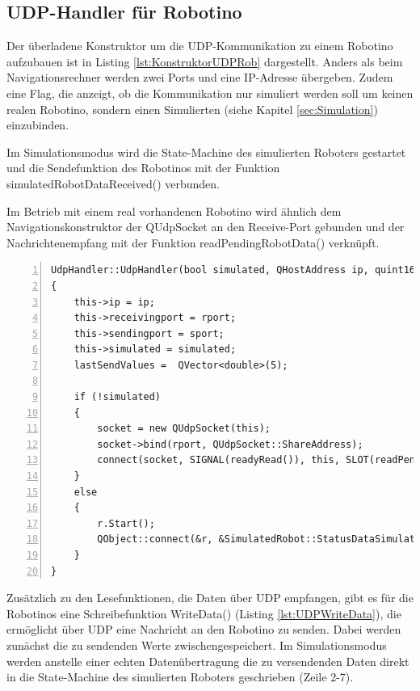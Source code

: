 \subsection{UDP-Handler für Robotino}

Der überladene Konstruktor um die UDP-Kommunikation zu einem Robotino aufzubauen ist in Listing \ref{lst:KonstruktorUDPRob} dargestellt. Anders als beim Navigationsrechner werden zwei Ports und eine IP-Adresse übergeben. Zudem eine Flag, die anzeigt, ob die Kommunikation nur simuliert werden soll um keinen realen Robotino, sondern einen Simulierten (siehe Kapitel \ref{sec:Simulation}) einzubinden. 

Im Simulationsmodus wird die State-Machine des simulierten Roboters gestartet und die Sendefunktion des Robotinos mit der Funktion simulatedRobotDataReceived() verbunden.

Im Betrieb mit einem real vorhandenen Robotino wird ähnlich dem Navigationskonstruktor der QUdpSocket an den Receive-Port gebunden und der Nachrichtenempfang mit der Funktion readPendingRobotData() verknüpft. 

\begin{lstlisting}[frame=single, breaklines=true, numbers=left, stepnumber=2, firstnumber=1, numberstyle = \tiny, caption=UDP-Handler Konstruktor für Navigationsdatenaustausch,label=lst:KonstruktorUDPRob]
UdpHandler::UdpHandler(bool simulated, QHostAddress ip, quint16 sport, quint16 rport, QObject *parent) : QObject(parent)
{
    this->ip = ip;
    this->receivingport = rport;
    this->sendingport = sport;
    this->simulated = simulated;
    lastSendValues =  QVector<double>(5);

    if (!simulated)
    {
        socket = new QUdpSocket(this);
        socket->bind(rport, QUdpSocket::ShareAddress);
        connect(socket, SIGNAL(readyRead()), this, SLOT(readPendingRobotData()));
    }
    else
    {
        r.Start();
        QObject::connect(&r, &SimulatedRobot::StatusDataSimulatedReceived, this, &UdpHandler::simulatedRobotDataReceived);
    }
}

\end{lstlisting}

Zusätzlich zu den Lesefunktionen, die Daten über UDP empfangen, gibt es für die Robotinos eine Schreibefunktion WriteData() (Listing \ref{lst:UDPWriteData}), die ermöglicht über UDP eine Nachricht an den Robotino zu senden. Dabei werden zunächst die zu sendenden Werte zwischengespeichert. Im Simulationsmodus werden anstelle einer echten Datenübertragung die zu versendenden Daten direkt in die State-Machine des simulierten Roboters geschrieben (Zeile 2-7). 

